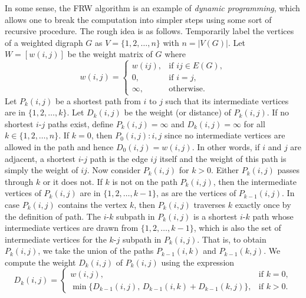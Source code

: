 In some sense, the FRW algorithm is an example of
\emph{dynamic programming}, which allows one to break the computation
into simpler steps using some sort of recursive procedure. The rough
idea is as follows. Temporarily label the vertices of a weighted
digraph $G$ as $V = \{1,2,\dots,n\}$ with $n = |V(G)|$. Let
$W = [w(i,j)]$ be the weight matrix of $G$ where
%
\begin{equation}
\label{eq:graph_algorithms:Floyd_Roy_Warshall_weight_matrix}
w(i,j)
=
\begin{cases}
w(ij), & \text{if $ij \in E(G)$}, \\
0, & \text{if $i = j$}, \\
\infty, & \text{otherwise}.
\end{cases}
\end{equation}
%
Let $P_k(i,j)$ be a shortest path from $i$ to $j$ such that its
intermediate vertices are in $\{1, 2, \dots, k\}$. Let $D_k(i,j)$ be
the weight (or distance) of $P_k(i,j)$. If no shortest $i$-$j$ paths
exist, define $P_k(i,j) = \infty$ and $D_k(i,j) = \infty$ for all
$k \in \{1, 2, \dots, n\}$. If $k = 0$, then $P_0(i,j): i, j$ since no
intermediate vertices are allowed in the path and hence
$D_0(i,j) = w(i,j)$. In other words, if $i$ and $j$ are adjacent, a
shortest $i$-$j$ path is the edge $ij$ itself and the weight of this
path is simply the weight of $ij$. Now consider $P_k(i,j)$ for
$k > 0$. Either $P_k(i,j)$ passes through $k$ or it does not. If $k$
is not on the path $P_k(i,j)$, then the intermediate vertices of
$P_k(i,j)$ are in  $\{1, 2, \dots, k-1\}$, as are the vertices of
$P_{k-1}(i,j)$. In case $P_k(i,j)$ contains the vertex $k$, then
$P_k(i,j)$ traverses $k$ exactly once by the definition of path. The
$i$-$k$ subpath in $P_k(i,j)$ is a shortest $i$-$k$ path whose
intermediate vertices are drawn from $\{1, 2, \dots, k-1\}$, which is
also the set of intermediate vertices for the $k$-$j$ subpath in
$P_k(i,j)$. That is, to obtain $P_k(i,j)$, we take the union of the
paths $P_{k-1}(i,k)$ and $P_{k-1}(k,j)$. We compute the weight
$D_k(i,j)$ of $P_k(i,j)$ using the expression
%
\begin{equation}
\label{eq:graph_algorithms:Floyd_Roy_Warshall:shortest_path_weights}
D_k(i,j)
=
\begin{cases}
w(i,j), & \text{if $k = 0$}, \\
\min\{D_{k-1}(i,j),\, D_{k-1}(i,k) + D_{k-1}(k,j)\}, & \text{if $k > 0$}.
\end{cases}
\end{equation}

